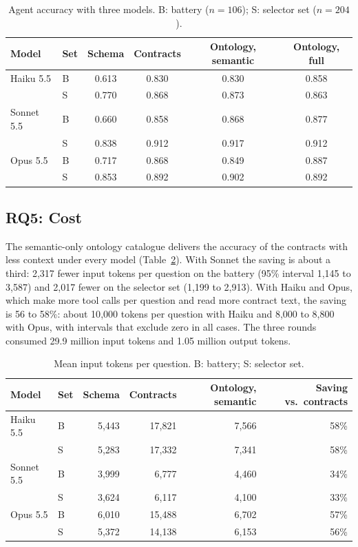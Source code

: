 \begin{table}[ht]
\centering\small
\caption{Agent accuracy with three models. B: battery ($n=106$); S: selector set ($n=204$).}
\label{tab:models}
\begin{tabular}{llcccc}
\toprule
Model & Set & Schema & Contracts & Ontology, semantic & Ontology, full \\
\midrule
Haiku 5.5 & B & 0.613 & 0.830 & 0.830 & 0.858 \\
 & S & 0.770 & 0.868 & 0.873 & 0.863 \\
Sonnet 5.5 & B & 0.660 & 0.858 & 0.868 & 0.877 \\
 & S & 0.838 & 0.912 & 0.917 & 0.912 \\
Opus 5.5 & B & 0.717 & 0.868 & 0.849 & 0.887 \\
 & S & 0.853 & 0.892 & 0.902 & 0.892 \\
\bottomrule
\end{tabular}
\end{table}

\subsection{RQ5: Cost}
The semantic-only ontology catalogue delivers the accuracy of the contracts with less
context under every model (Table~\ref{tab:tokens}). With Sonnet the saving is about a third:
2{,}317 fewer input tokens per question on the battery (95\% interval 1{,}145 to 3{,}587)
and 2{,}017 fewer on the selector set (1{,}199 to 2{,}913). With Haiku and Opus, which make
more tool calls per question and read more contract text, the saving is 56 to 58\%: about
10{,}000 tokens per question with Haiku and 8{,}000 to 8{,}800 with Opus, with intervals
that exclude zero in all cases. The three rounds consumed 29.9 million input tokens and 1.05
million output tokens.

\begin{table}[ht]
\centering\small
\caption{Mean input tokens per question. B: battery; S: selector set.}
\label{tab:tokens}
\begin{tabular}{llrrrr}
\toprule
Model & Set & Schema & Contracts & Ontology, semantic & Saving vs.\ contracts \\
\midrule
Haiku 5.5 & B & 5{,}443 & 17{,}821 & 7{,}566 & 58\% \\
 & S & 5{,}283 & 17{,}332 & 7{,}341 & 58\% \\
Sonnet 5.5 & B & 3{,}999 & 6{,}777 & 4{,}460 & 34\% \\
 & S & 3{,}624 & 6{,}117 & 4{,}100 & 33\% \\
Opus 5.5 & B & 6{,}010 & 15{,}488 & 6{,}702 & 57\% \\
 & S & 5{,}372 & 14{,}138 & 6{,}153 & 56\% \\
\bottomrule
\end{tabular}
\end{table}


